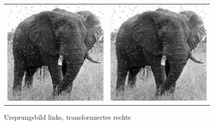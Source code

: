 \documentclass[a4paper]{scrartcl}
\begin{document}
\begin{aufgabe}
\begin{enumerate}[a)]
		\begin{figure}[h]
			\centering
			\caption{Ursprungsbild links, transformiertes rechts}
			\begin{tabular}{cc}
				\includegraphics[scale=0.3]{num1_4_4/num1_4_4_1.png}&
				\includegraphics[scale=0.3]{num1_4_4/num1_4_4_2.png}
			\end{tabular}
		\end{figure}
	\end{enumerate}
\end{aufgabe}
\end{document}
